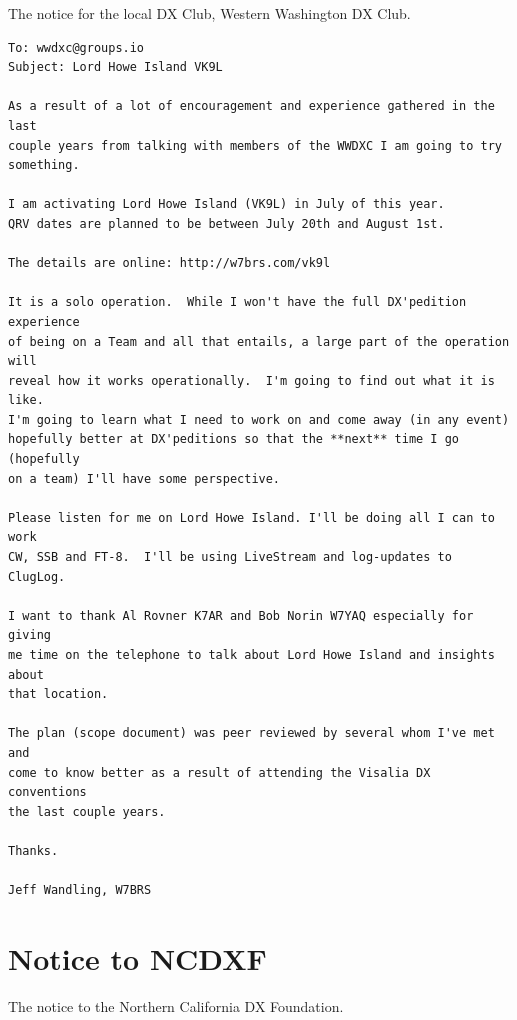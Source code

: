 \documentclass[11pt]{article}
\begin{document}
The notice for the local DX Club, Western Washington DX Club.

\begin{Verbatim}[fontsize=\small]
To: wwdxc@groups.io
Subject: Lord Howe Island VK9L

As a result of a lot of encouragement and experience gathered in the last
couple years from talking with members of the WWDXC I am going to try 
something.

I am activating Lord Howe Island (VK9L) in July of this year.
QRV dates are planned to be between July 20th and August 1st.

The details are online: http://w7brs.com/vk9l

It is a solo operation.  While I won't have the full DX'pedition experience
of being on a Team and all that entails, a large part of the operation will
reveal how it works operationally.  I'm going to find out what it is like.
I'm going to learn what I need to work on and come away (in any event)
hopefully better at DX'peditions so that the **next** time I go (hopefully
on a team) I'll have some perspective.

Please listen for me on Lord Howe Island. I'll be doing all I can to work
CW, SSB and FT-8.  I'll be using LiveStream and log-updates to ClugLog.

I want to thank Al Rovner K7AR and Bob Norin W7YAQ especially for giving
me time on the telephone to talk about Lord Howe Island and insights about
that location.

The plan (scope document) was peer reviewed by several whom I've met and 
come to know better as a result of attending the Visalia DX conventions
the last couple years.

Thanks.

Jeff Wandling, W7BRS
\end{Verbatim}

\section{Notice to NCDXF}

The notice to the Northern California DX Foundation.
\end{document}
